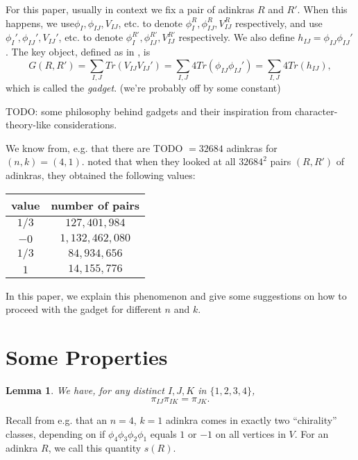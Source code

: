 \documentclass[12pt,twoside,singlespace]{amsart}
\numberwithin{equation}{section}
\newtheorem{lem}[equation]{Lemma}
\theoremstyle{definition}
\begin{document}
For this paper, usually in context we fix a pair of adinkras $R$ and $R'$. When this happens, we use$\phi_I, \phi_{IJ}, V_{IJ}$, etc. to denote $\phi_I^R, \phi_{IJ}^R, V_{IJ}^R$ respectively, and use $\phi_I', \phi_{IJ}', V_{IJ}'$, etc. to denote $\phi_I^{R'}, \phi_{IJ}^{R'}, V_{IJ}^{R'}$ respectively. We also define $h_{IJ} = \phi_{IJ} \phi_{IJ}'$. The key object, defined as in \cite{gates:big_gadgets}, is
\[
G(R,R') = \sum_{I,J} Tr(V_{IJ}V_{IJ}') = \sum_{I,J} 4 Tr(\phi_{IJ} \phi_{IJ}') = \sum_{I,J} 4 Tr(h_{IJ}),
\]
which is called the \emph{gadget}. (we're probably off by some constant)

TODO: some philosophy behind gadgets and their inspiration from character-theory-like considerations.

We know from, e.g. \cite{zhang:combinatorics} that there are TODO $= 32684$ adinkras for $(n,k) = (4,1)$. \cite{gates:big_gadgets} noted that when they looked at all $32684^2$ pairs $(R,R')$ of adinkras, they obtained the following values:

\begin{tabular}{cc}
value & number of pairs \\
\hline
$1/3$ & $127,401,984$ \\ 
$-0$ & $1,132,462,080$ \\
$1/3$ & $84,934,656$ \\
$1$ & $14,155,776$ 
\end{tabular}

In this paper, we explain this phenomenon and give some suggestions on how to proceed with the gadget for different $n$ and $k$.

\section{Some Properties}

\begin{lem}
\label{lem:group}
We have, for any distinct $I, J, K$ in $\{1,2,3,4\}$,
\[
\pi_{IJ} \pi_{IK} = \pi_{JK}.
\]
\end{lem}

Recall from e.g. \cite{whichever} that an $n=4$, $k=1$ adinkra comes in exactly two ``chirality'' classes, depending on if $\phi_4\phi_3\phi_2\phi_1$ equals $1$ or $-1$ on all vertices in $V$. For an adinkra $R$, we call this quantity $s(R)$.
\end{document}
